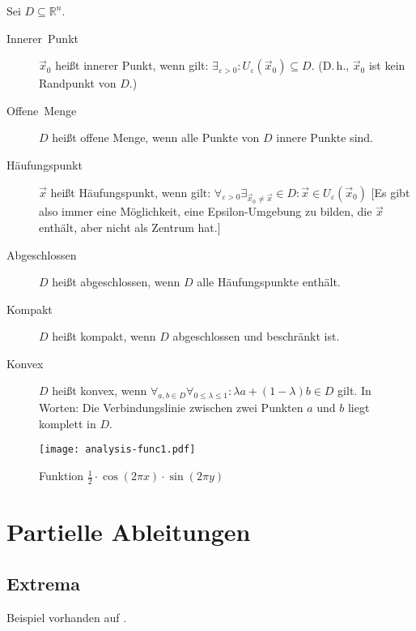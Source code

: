 Sei $D \subseteq \mathbb{R}^n$.
\begin{description}
  \item [{Innerer~Punkt}] 
	$\vec x_0$ heißt innerer Punkt, wenn gilt:
	$\exists_{\varepsilon>0} : U_{\varepsilon}(\vec x_0) \subseteq D$.
	(D.\,h., $\vec x_0$ ist kein Randpunkt von $D$.)
  \item [{Offene~Menge}] 
	$D$ heißt offene Menge, wenn alle Punkte von $D$ innere Punkte sind.
  \item [{Häufungspunkt}] 
	$\vec x$ heißt Häufungspunkt, wenn gilt:
	$\forall_{\varepsilon>0} \exists_{\vec x_0 \neq \vec x} \in D : \vec x \in U_{\varepsilon}(\vec x_0)$
	[Es gibt also immer eine Möglichkeit, eine Epsilon-Umgebung zu bilden, die $\vec x$ enthält, aber nicht als Zentrum hat.]
  \item [{Abgeschlossen}] 
	$D$ heißt abgeschlossen, wenn $D$ alle Häufungspunkte enthält.
  \item [{Kompakt}] 
	$D$ heißt kompakt, wenn $D$ abgeschlossen und beschränkt ist.
  \item [{Konvex}] 
	$D$ heißt konvex, wenn $\forall_{a,b \in D} \forall_{ 0\leq\lambda\leq1 } : \lambda a+(1-\lambda)b\in D$ gilt.
	In Worten: Die Verbindungslinie zwischen zwei Punkten $a$ und $b$ liegt komplett in $D$.
\end{description}


\begin{figure}[htb]
\centering\texttt{[image: analysis-func1.pdf]}

\caption{Funktion $\frac{1}{2} \cdot \cos(2\pi x) \cdot \sin(2\pi y)$}
\end{figure}


\section{Partielle Ableitungen}

\subsection{Extrema}

\CheckedBox{} Beispiel vorhanden auf .


